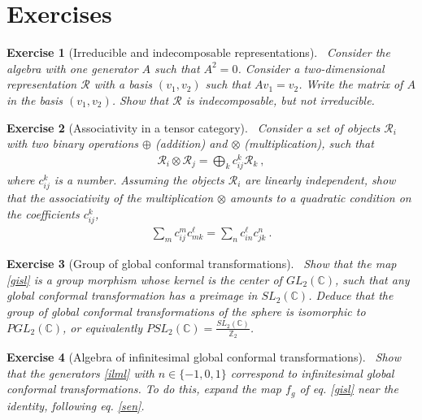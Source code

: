 \documentclass[12pt, a4paper, notitlepage, twoside]{report}
\numberwithin{equation}{section}
\theoremstyle{break}
\newtheorem{exo}{Exercise}[chapter]
\begin{document}
\section{Exercises}


\begin{exo}[Irreducible and indecomposable representations] 
~\label{exoirr}
Consider the algebra with one generator $A$ such that $A^2 = 0$.
Consider a two-dimensional representation $\mathcal{R}$ with a basis $(v_1,v_2)$ such that $Av_1=v_2$.
Write the matrix of $A$ in the basis $(v_1,v_2)$.
Show that $\mathcal{R}$ is indecomposable, but not irreducible. 
\end{exo}

\begin{exo}[Associativity in a tensor category]
 ~\label{exoten}
Consider a set of objects $\mathcal{R}_i$ with two binary operations $\oplus$ (addition) and $\otimes$ (multiplication), such that 
\begin{align}
 \mathcal{R}_i \otimes \mathcal{R}_j = \bigoplus_k c_{ij}^k \mathcal{R}_k\ ,
\end{align}
where $c_{ij}^k$ is a number.
Assuming the objects $\mathcal{R}_i$ are linearly independent, show that the associativity of the multiplication $\otimes$ amounts to a quadratic condition on the coefficients $c_{ij}^k$,
\begin{align}
 \sum_m c_{ij}^m c_{mk}^\ell = \sum_n c_{in}^\ell c_{jk}^n\ .
\end{align}
\end{exo}

\begin{exo}[Group of global conformal transformations]
 ~\label{exoiso}
Show that the map \eqref{gisl} is a group morphism whose kernel is the center of $GL_2({\mathbb{C}})$, such that any global conformal transformation has a preimage in $SL_2(\mathbb{C})$.
Deduce that the group of global conformal transformations of the sphere is isomorphic to $PGL_2({\mathbb{C}})$, or equivalently $PSL_2(\mathbb{C}) = \frac{SL_2(\mathbb{C})}{\mathbb{Z}_2}$.
\end{exo}

\begin{exo}[Algebra of infinitesimal global conformal transformations]
 ~\label{exomoz}
Show that the generators \eqref{ilml} with $n\in\{-1,0,1\}$ correspond to infinitesimal global conformal transformations.
To do this, expand the map $f_g$ of eq. \eqref{gisl} near the identity, following eq. \eqref{sen}.
\end{exo}
\end{document}
